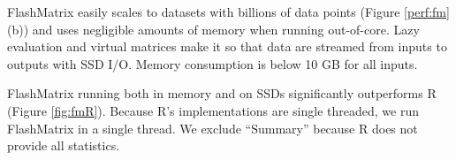 
FlashMatrix easily scales to datasets with billions of data points
(Figure \ref{perf:fm}(b)) and uses negligible amounts of memory when running out-of-core.
Lazy evaluation and virtual matrices make it so that data are streamed from 
inputs to outputs with SSD I/O.  Memory consumption is below 10 GB for all inputs.

FlashMatrix running both in memory and on SSDs significantly outperforms R
(Figure \ref{fig:fmR}).  Because R's implementations are single threaded,
we run FlashMatrix in a single thread. 
We exclude ``Summary'' because R does not provide all statistics.

